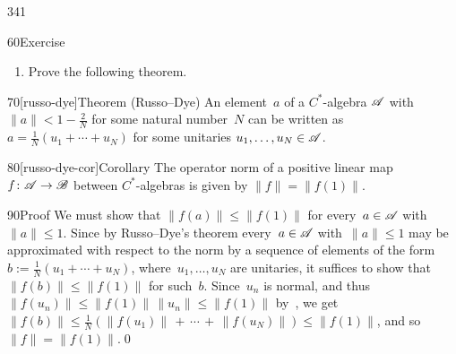 \begin{parsec}{341}
\begin{point}{60}{Exercise}
\begin{enumerate}
\item
Prove the following theorem.
\end{enumerate}
\end{point}
\begin{point}{70}[russo-dye]{Theorem (Russo--Dye)}%
An element~$a$ of a $C^*$-algebra $\mathscr{A}$
with $\|a\|< 1-\frac{2}{N}$
for some natural number~$N$
can be written as~$a=\frac{1}{N}(u_1+\dotsb + u_N)$
for some unitaries $u_1,\dotsc,u_N\in \mathscr{A}$.
\end{point}
\begin{point}{80}[russo-dye-cor]{Corollary}%
The operator norm of a positive
    linear map~$f\colon\mathscr{A}\to\mathscr{B}$ between
    $C^*$-algebras is given by  $\|f\|=\|f(1)\|$.
\begin{point}{90}{Proof}%
We must show that $\|f(a)\|\leq \|f(1)\|$
for every~$a\in\mathscr{A}$ with~$\|a\|\leq 1$.
Since by Russo--Dye's theorem 
every~$a\in\mathscr{A}$ with~$\|a\|\leq 1$ 
may be approximated with respect to the norm by a sequence
of elements of the form  $b:=\frac{1}{N}(u_1+\dotsb+u_N)$,
where~$u_1,\dotsc,u_N$ are unitaries,
it suffices to show that $\|f(b)\|\leq \|f(1)\|$
for such~$b$.
Since~$u_n$ is normal,
    and thus $\|f(u_n)\|\leq \|f(1)\|\,\|u_n\|\leq \|f(1)\|$
    by~,
    we get $\|f(b)\|\leq \frac{1}{N}(\|f(u_1)\|\,+\,\dotsb\,+\,\|f(u_N)\|)
    \leq \|f(1)\|$, and so $\|f\|=\|f(1)\|$.\qed
\end{point}
\end{point}
\end{parsec}

